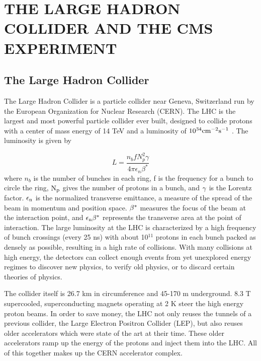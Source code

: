 \chapter{THE LARGE HADRON COLLIDER AND THE CMS EXPERIMENT} \label{lhc-cms}

\section{The Large Hadron Collider}
The Large Hadron Collider is a particle collider near Geneva, Switzerland run by the European Organization for Nuclear Research (CERN). The LHC is the largest and most powerful particle collider ever built, designed to collide protons with a center of mass energy of 14 TeV and a luminosity of $10^{34} {\rm cm^{-2}s^{-1}}$ \cite{LHC}. The luminosity is given by

\begin{equation}
L = \frac{n_{b} f N^{2}_{p} \gamma}{4\pi\epsilon_{n}\beta^{*}}
\end{equation}
where $n_{b}$ is the number of bunches in each ring, f is the frequency for a bunch to circle the ring, ${\rm N_{p}}$ gives the number of protons in a bunch, and ${\rm \gamma}$ is the Lorentz factor. ${\rm \epsilon_{n}}$ is the normalized transverse emittance, a measure of the spread of the beam in momentum and position space. ${\rm \beta^{*}}$ measures the focus of the beam at the interaction point, and ${\rm \epsilon_{n}\beta^{*}}$ represents the transverse area at the point of interaction. The large luminosity at the LHC is characterized by a high frequency of bunch crossings (every 25 ns) with about 10$^{11}$ protons in each bunch packed as densely as possible, resulting in a high rate of collisions. With many collisions at high energy, the detectors can collect enough events from yet unexplored energy regimes to discover new physics, to verify old physics, or to discard certain theories of physics. 

The collider itself is 26.7 km in circumference and 45-170 m underground. 8.3 T supercooled, superconducting magnets operating at 2 K steer the high energy proton beams. In order to save money, the LHC not only reuses the tunnels of a previous collider, the Large Electron Positron Collider (LEP), but also reuses older accelerators which were state of the art at their time. These older accelerators ramp up the energy of the protons and inject them into the LHC. All of this together makes up the CERN accelerator complex.

